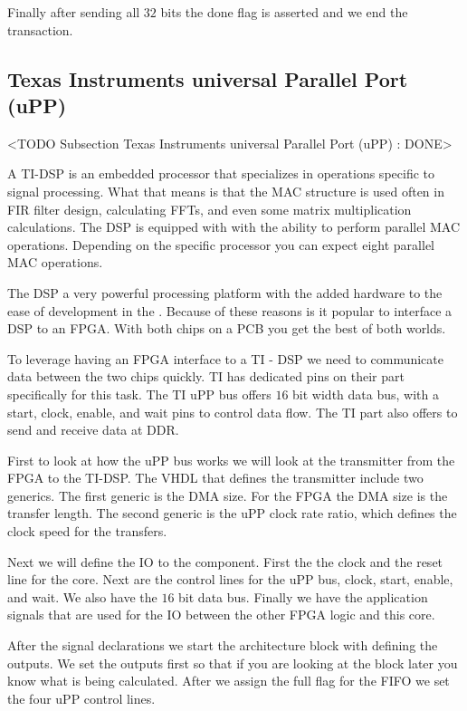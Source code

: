 Finally after sending all $32$ bits the done flag is asserted and we end the transaction. 
	
	
\subsection{Texas Instruments universal Parallel Port (uPP)}
	<TODO Subsection Texas Instruments universal Parallel Port (uPP) : DONE>
	
A \ac{TI}-\ac{DSP} is an embedded processor that specializes in operations specific to signal processing. What that means is that the \ac{MAC} structure is used often in \ac{FIR} filter design, calculating \ac{FFT}s, and even some matrix multiplication calculations. The \ac{DSP} is equipped with with the ability to perform parallel \ac{MAC} operations. Depending on the specific processor you can expect eight parallel \ac{MAC} operations. 

The \ac{DSP} a very powerful processing platform with the added hardware to the ease of development in the . Because of these reasons is it popular to interface a \ac{DSP} to an \ac{FPGA}. With both chips on a \ac{PCB} you get the best of both worlds. 

To leverage having an \ac{FPGA} interface to a \ac{TI} - \ac{DSP} we need to communicate data between the two chips quickly. \ac{TI} has dedicated pins on their part specifically for this task. The \ac{TI} \ac{uPP} bus offers $16$ bit width data bus, with a start, clock, enable, and wait pins to control data flow. The \ac{TI} part also offers to send and receive data at \ac{DDR}. 

First to look at how the \ac{uPP} bus works we will look at the transmitter from the \ac{FPGA} to the \ac{TI}-\ac{DSP}. The \ac{VHDL} that defines the transmitter include two generics. The first generic is the \ac{DMA} size. For the \ac{FPGA} the \ac{DMA} size is the transfer length. The second generic is the \ac{uPP} clock rate ratio, which defines the clock speed for the transfers. 

Next we will define the \ac{IO} to the component. First the the clock and the reset line for the core. Next are the control lines for the \ac{uPP} bus, clock, start, enable, and wait. We also have the $16$ bit data bus. Finally we have the application signals that are used for the \ac{IO} between the other \ac{FPGA} logic and this core. 

After the signal declarations we start the architecture block with defining the outputs. We set the outputs first so that if you are looking at the block later you know what is being calculated. After we assign the full flag for the \ac{FIFO} we set the four \ac{uPP} control lines. 

